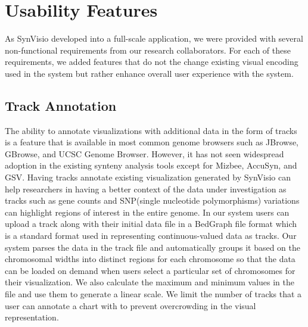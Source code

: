 \section{Usability Features}
As SynVisio developed into a full-scale application, we were provided with several non-functional requirements from our research collaborators. For each of these requirements, we added features that do not the change existing visual encoding used in the system but rather enhance overall user experience with the system. 

\subsection{Track Annotation}
The ability to annotate visualizations with additional data in the form of tracks is a feature that is available in most common genome browsers such as JBrowse, GBrowse, and UCSC Genome Browser\cite{skinner2009jbrowse,donlin2009using,karolchik2003ucsc}. However, it has not seen widespread adoption in the existing synteny analysis tools except for Mizbee,  AccuSyn, and GSV\cite{Meyer2009,accusyn,revanna2012web}.  Having tracks annotate existing visualization generated by SynVisio can help researchers in having a better context of the data under investigation as tracks such as gene counts and SNP(single nucleotide polymorphisms) variations can highlight regions of interest in the entire genome. In our system users can upload a track along with their initial data file in a BedGraph file format which is a standard format used in representing continuous-valued data as tracks. Our system parses the data in the track file and automatically groups it based on the chromosomal widths into distinct regions for each chromosome so that the data can be loaded on demand when users select a particular set of chromosomes for their visualization. We also calculate the maximum and minimum values in the file and use them to generate a linear scale. We limit the number of tracks that a user can annotate a chart with to prevent overcrowding in the visual representation.

